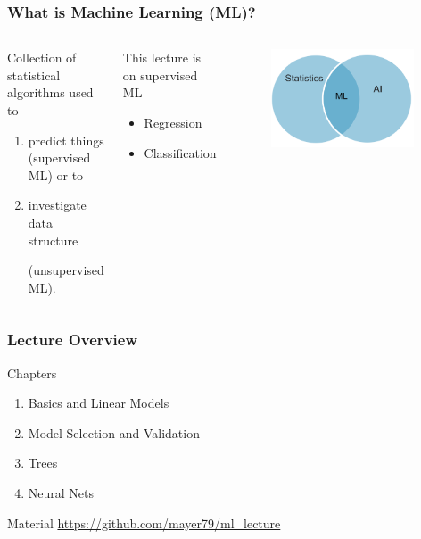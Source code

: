 \documentclass[
    utf8,
    aspectratio=169
]{beamer}  %
\begin{document}
\begin{frame}
\frametitle{What is Machine Learning (ML)?}
\begin{columns}
	\begin{block}{Collection of statistical algorithms used to}
		\begin{enumerate}
			\item predict things (supervised ML) or to
			\item investigate data structure 
			
			(unsupervised ML).
		\end{enumerate}
	\end{block}	
	\begin{block}{This lecture is on supervised ML}
		\begin{itemize}
			\item Regression
			\item Classification
		\end{itemize}
	\end{block}
	\begin{figure}
		\includegraphics[width=0.95\textwidth]{pics/ml.png}
	\end{figure}
\end{columns}
\end{frame}

\begin{frame}
\frametitle{Lecture Overview}
\begin{block}{Chapters}
	\begin{enumerate}
		\item Basics and Linear Models
		\item Model Selection and Validation
		\item Trees
		\item Neural Nets
	\end{enumerate}
\end{block}

\begin{block}{Material}
	\url{https://github.com/mayer79/ml\_lecture}
\end{block}
\end{frame}
\end{document}
